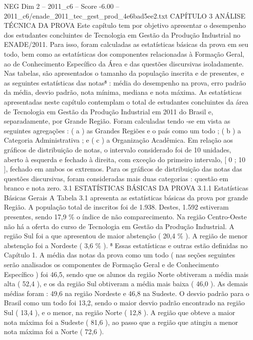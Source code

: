 \begin{textsample}{NEG Dim 2 – 2011\_c6 – Score -6.00 – 2011\_c6/enade\_2011\_tec\_gest\_prod\_4e6bad5ee2.txt}  \label{ex:f2_neg_023}
CAPÍTULO 3 ANÁLISE TÉCNICA DA PROVA Este capítulo tem por objetivo apresentar o desempenho dos estudantes concluintes de Tecnologia em Gestão da Produção Industrial no ENADE/2011.
Para isso, foram calculadas as estatísticas básicas da prova em seu todo, bem como as estatísticas dos componentes relacionadas à Formação Geral, ao de Conhecimento Específico da Área e das questões discursivas isoladamente.
Nas tabelas, são apresentados o tamanho da população inscrita e de presentes, e as seguintes estatísticas das notas⁸ : média do desempenho na prova, erro padrão da média, desvio padrão, nota mínima, mediana e nota máxima.
As estatísticas apresentadas neste capítulo contemplam o total de estudantes concluintes da área de Tecnologia em Gestão da Produção Industrial em 2011 do Brasil e, separadamente, por Grande Região.
Foram calculadas tendo -se em vista as seguintes agregações : ( a ) as Grandes Regiões e o país como um todo ; ( b ) a Categoria Administrativa ; e ( c ) a Organização Acadêmica.
Em relação aos gráficos de distribuição de notas, o intervalo considerado foi de 10 unidades, aberto à esquerda e fechado à direita, com exceção do primeiro intervalo, [ 0 ; 10 ], fechado em ambos os extremos.
Para os gráficos de distribuição das notas das questões discursivas, foram consideradas mais duas categorias : questão em branco e nota zero. 3.1 ESTATÍSTICAS BÁSICAS DA PROVA 3.1.1 Estatísticas Básicas Gerais A Tabela 3.1 apresenta as estatísticas básicas da prova por grande Região.
A população total de inscritos foi de 1.938.
Destes, 1.592 estiveram presentes, sendo 17,9 \% o índice de não comparecimento.
Na região Centro-Oeste não há a oferta do curso de Tecnologia em Gestão da Produção Industrial.
A região Sul foi a que apresentou de maior abstenção ( 20,4 \% ).
A região de menor abstenção foi a Nordeste ( 3,6 \% ). ⁸ Essas estatísticas e outras estão definidas no Capítulo 1.
A média das notas da prova como um todo ( nas seções seguintes serão analisados os componentes de Formação Geral e de Conhecimento Específico ) foi 46,5, sendo que os alunos da região Norte obtiveram a média mais alta ( 52,4 ), e os da região Sul obtiveram a média mais baixa ( 46,0 ).
As demais médias foram : 49,6 na região Nordeste e 46,8 na Sudeste.
O desvio padrão para o Brasil como um todo foi 13,2, sendo o maior desvio padrão encontrado na região Sul ( 13,4 ), e o menor, na região Norte ( 12,8 ).
A região que obteve a maior nota máxima foi a Sudeste ( 81,6 ), ao passo que a região que atingiu a menor nota máxima foi a Norte ( 72,6 ).

\end{textsample}
